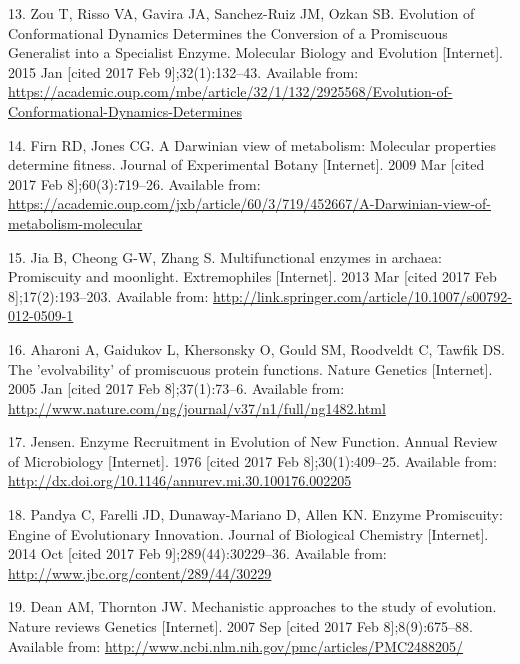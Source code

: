 \documentclass[12pt,twoside]{reedthesis}
\begin{document}
{  \hypertarget{ref-zou_evolution_2015}{}
  13. Zou T, Risso VA, Gavira JA, Sanchez-Ruiz JM, Ozkan SB. Evolution of
  Conformational Dynamics Determines the Conversion of a Promiscuous
  Generalist into a Specialist Enzyme. Molecular Biology and Evolution
  {[}Internet{]}. 2015 Jan {[}cited 2017 Feb 9{]};32(1):132--43. Available
  from:
  \url{https://academic.oup.com/mbe/article/32/1/132/2925568/Evolution-of-Conformational-Dynamics-Determines}
  
  \hypertarget{ref-firn_darwinian_2009}{}
  14. Firn RD, Jones CG. A Darwinian view of metabolism: Molecular
  properties determine fitness. Journal of Experimental Botany
  {[}Internet{]}. 2009 Mar {[}cited 2017 Feb 8{]};60(3):719--26. Available
  from:
  \url{https://academic.oup.com/jxb/article/60/3/719/452667/A-Darwinian-view-of-metabolism-molecular}
  
  \hypertarget{ref-jia_multifunctional_2013}{}
  15. Jia B, Cheong G-W, Zhang S. Multifunctional enzymes in archaea:
  Promiscuity and moonlight. Extremophiles {[}Internet{]}. 2013 Mar
  {[}cited 2017 Feb 8{]};17(2):193--203. Available from:
  \url{http://link.springer.com/article/10.1007/s00792-012-0509-1}
  
  \hypertarget{ref-aharoni_evolvability_2005}{}
  16. Aharoni A, Gaidukov L, Khersonsky O, Gould SM, Roodveldt C, Tawfik
  DS. The 'evolvability' of promiscuous protein functions. Nature Genetics
  {[}Internet{]}. 2005 Jan {[}cited 2017 Feb 8{]};37(1):73--6. Available
  from: \url{http://www.nature.com/ng/journal/v37/n1/full/ng1482.html}
  
  \hypertarget{ref-jensen_enzyme_1976}{}
  17. Jensen. Enzyme Recruitment in Evolution of New Function. Annual
  Review of Microbiology {[}Internet{]}. 1976 {[}cited 2017 Feb
  8{]};30(1):409--25. Available from:
  \url{http://dx.doi.org/10.1146/annurev.mi.30.100176.002205}
  
  \hypertarget{ref-pandya_enzyme_2014}{}
  18. Pandya C, Farelli JD, Dunaway-Mariano D, Allen KN. Enzyme
  Promiscuity: Engine of Evolutionary Innovation. Journal of Biological
  Chemistry {[}Internet{]}. 2014 Oct {[}cited 2017 Feb
  9{]};289(44):30229--36. Available from:
  \url{http://www.jbc.org/content/289/44/30229}
  
  \hypertarget{ref-dean_mechanistic_2007}{}
  19. Dean AM, Thornton JW. Mechanistic approaches to the study of
  evolution. Nature reviews Genetics {[}Internet{]}. 2007 Sep {[}cited
  2017 Feb 8{]};8(9):675--88. Available from:
  \url{http://www.ncbi.nlm.nih.gov/pmc/articles/PMC2488205/}
  
}
\end{document}
